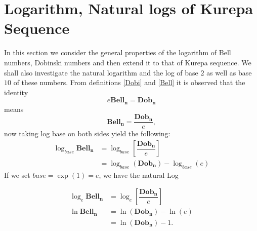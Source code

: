 \documentclass[pdflatex,sn-mathphys-num]{sn-jnl}%
\theoremstyle{thmstyleone}%
\theoremstyle{thmstyletwo}%
\theoremstyle{thmstylethree}%
\begin{document}
\section{Logarithm, Natural logs of Kurepa Sequence}\label{Entrolog}
In this section we consider the general properties of the logarithm of Bell numbers, Dobinski numbers and then extend it to that of Kurepa sequence. We shall also investigate the natural logarithm and the log of base $2$ as well as base $10$ of these numbers.
From definitions \ref{Dobi} and \ref{Bell} it is observed that the identity
$$e\mathbf{Bell_n}=\mathbf{Dob_n}$$ means $$\mathbf{Bell_n}=\dfrac{\mathbf{Dob_n}}{e},$$
now taking log base on both sides yield the following:
\begin{align*}
    \log_{base}\mathbf{Bell_n}&= \log_{base}\left[\dfrac{\mathbf{Dob_n}}{e}\right]\\ \nonumber
    &=\log_{base}(\mathbf{Dob_n})-\log_{base}(e)
\end{align*}
If we set $base=\exp{(1)}=e$, we have the natural Log

\begin{align}\label{entropy}
    \log_{e}\mathbf{Bell_n}&= \log_{e}\left[\dfrac{\mathbf{Dob_n}}{e}\right]\\ \nonumber
   \ln{\mathbf{Bell_n}} &=\ln(\mathbf{Dob_n})-\ln(e)\\ \nonumber
   &=\ln(\mathbf{Dob_n})-1.
\end{align}
\end{document}
